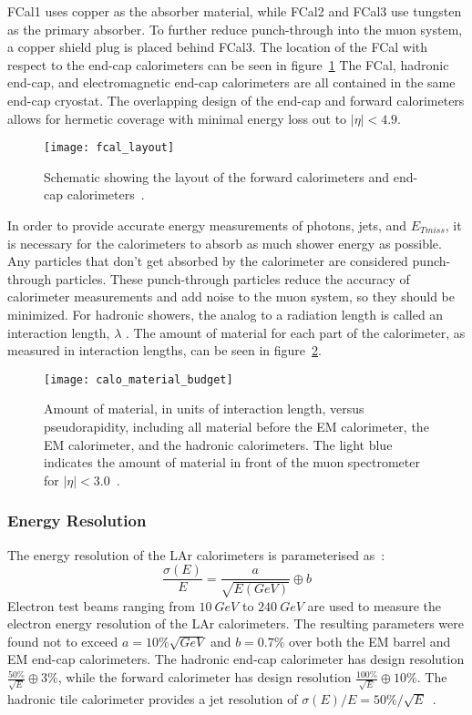 FCal1 uses copper as the absorber material, while FCal2 and FCal3 use tungsten as the primary absorber.
To further reduce punch-through into the muon system, a copper shield plug is placed behind FCal3.
The location of the FCal with respect to the end-cap calorimeters can be seen in figure~\ref{fig:fcal_layout}
The FCal, hadronic end-cap, and electromagnetic end-cap calorimeters are all contained in the same end-cap cryostat.
The overlapping design of the end-cap and forward calorimeters allows for hermetic coverage with minimal energy loss out to $|\eta| < 4.9$.

\begin{figure}[!ht]\centering
\texttt{[image: fcal\_layout]}
\caption{Schematic showing the layout of the forward calorimeters and end-cap calorimeters~\cite{atlas-detector-2008}.}
\label{fig:fcal_layout}
\end{figure}

In order to provide accurate energy measurements of photons, jets, and $E_{Tmiss}$, it is necessary for the calorimeters to absorb as much shower energy as possible.
Any particles that don't get absorbed by the calorimeter are considered punch-through particles.
These punch-through particles reduce the accuracy of calorimeter measurements and add noise to the muon system, so they should be minimized.
For hadronic showers, the analog to a radiation length is called an interaction length, $\lambda$ .
The amount of material for each part of the calorimeter, as measured in interaction lengths, can be seen in figure~\ref{fig:calo_material_budget}.

\begin{figure}[!ht]\centering
\texttt{[image: calo\_material\_budget]}
\caption{Amount of material, in units of interaction length, versus pseudorapidity, including all material before the EM calorimeter, the EM calorimeter, and the hadronic calorimeters.
The light blue indicates the amount of material in front of the muon spectrometer for $|\eta| < 3.0$~\cite{atlas-detector-2008}.}
\label{fig:calo_material_budget}
\end{figure}

\subsubsection{Energy Resolution}
The energy resolution of the LAr calorimeters is parameterised as~\cite{atlas-em-resolution}:
\begin{equation}
    \frac{\sigma(E)}{E} = \frac{a}{\sqrt{E(GeV)}}\oplus b
\end{equation}
Electron test beams ranging from $10~GeV$ to $240~GeV$ are used to measure the electron energy resolution of the LAr calorimeters.
The resulting parameters were found not to exceed $a=10\%\sqrt{GeV}$ and $b=0.7\%$ over both the EM barrel and EM end-cap calorimeters.
The hadronic end-cap calorimeter has design resolution $\frac{50\%}{\sqrt{E}}\oplus3\%$, while the forward calorimeter has design resolution $\frac{100\%}{\sqrt{E}}\oplus10\%$.
The hadronic tile calorimeter provides a jet resolution of $\sigma(E)/E = 50\%/\sqrt{E}$~\cite{atlas-detector-2008}.

